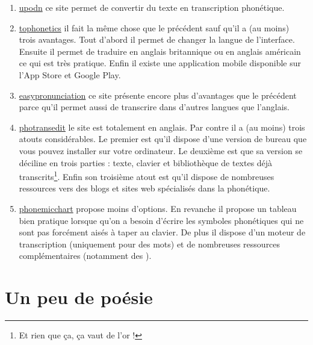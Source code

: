 \begin{enumerate}
\item \href{http://upodn.com/}{upodn} ce site permet de convertir du
  texte en transcription phonétique.
\item \href{https://tophonetics.com/}{tophonetics} il fait la même
  chose que le précédent sauf qu'il a (au moins) trois avantages. Tout
  d'abord il permet de changer la langue de l'interface. Ensuite il
  permet de traduire en anglais britannique ou en anglais américain ce
  qui est très pratique. Enfin il existe une application mobile
  disponible sur l'App Store et Google Play.
\item \href{https://easypronunciation.com/fr/}{easypronunciation} ce
  site présente encore plus d'avantages que le précédent parce qu'il
  permet aussi de transcrire dans d'autres langues que l'anglais.
\item \href{http://www.photransedit.com/}{photransedit} le site est
  totalement en anglais. Par contre il a (au moins) trois atouts
  considérables. Le premier est qu'il dispose d'une version de bureau
  que vous pouvez installer sur votre ordinateur. Le deuxième est que
  sa version  se déciline en trois parties : texte,
  clavier et bibliothèque de textes déjà transcrits\footnote{Et rien
    que ça, ça vaut de l'or !}. Enfin son troisième atout est qu'il
  dispose de nombreuses ressources vers des blogs et sites web
  spécialisés dans la phonétique.
\item \href{http://www.phonemicchart.com/}{phonemicchart} propose
  moins d'options. En revanche il propose un tableau bien pratique
  lorsque qu'on a besoin d'écrire les symboles phonétiques qui ne sont
  pas forcément aisés à taper au clavier. De plus il dispose d'un
  moteur de transcription (uniquement pour des mots) et de nombreuses
  ressources complémentaires (notamment des ).
\end{enumerate}

\newpage

\chapter{Un peu de poésie}

